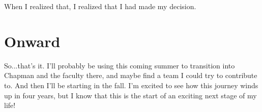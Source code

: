 \documentclass[]{article}
\begin{document}
When I realized that, I realized that I had made my decision.

\section{Onward}

So...that's it. I'll probably be using this coming summer to transition into
Chapman and the faculty there, and maybe find a team I could try to contribute
to. And then I'll be starting in the fall. I'm excited to see how this journey
winds up in four years, but I know that this is the start of an exciting next
stage of my life!
\end{document}
